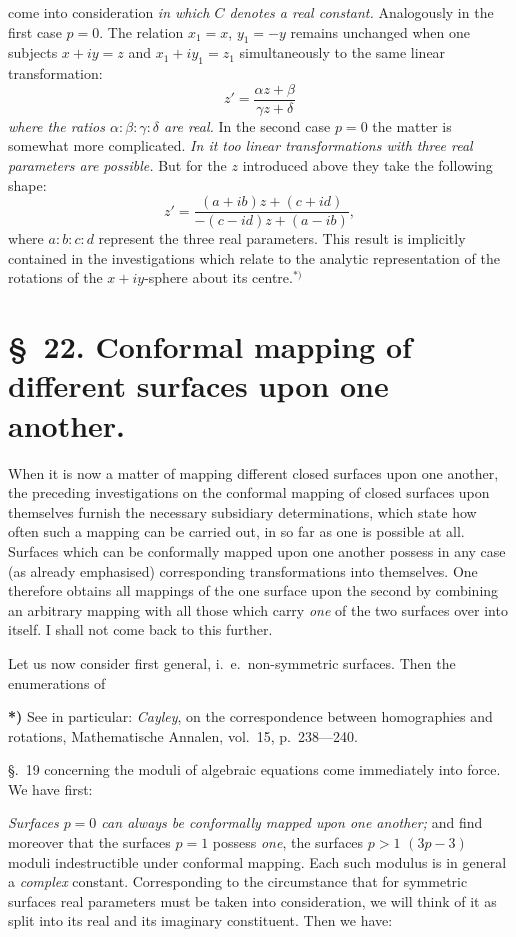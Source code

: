 \documentclass{article}
\begin{document}
come into consideration \emph{in which $C$ denotes a real constant.} Analogously in the first case $p = 0$. The relation $x_{1} = x$, $y_{1} = - y$ remains unchanged when one subjects $x + iy = z$ and $x_{1} + iy_{1} = z_{1}$ simultaneously to the same linear transformation:
\[ z' = \frac{\alpha z + \beta}{\gamma z + \delta} \]
\emph{where the ratios $\alpha : \beta : \gamma : \delta$ are real.} In the second case $p = 0$ the matter is somewhat more complicated. \emph{In it too linear transformations with three real parameters are possible.} But for the $z$ introduced above they take the following shape:
\[ z' = \frac{(a + ib)z + (c + id)}{- (c - id)z + (a - ib)}, \]
where $a : b : c : d$ represent the three real parameters. This result is implicitly contained in the investigations which relate to the analytic representation of the rotations of the $x + iy$-sphere about its centre.${}^{*)}$

\section*{§~22. Conformal mapping of different surfaces upon one another.}

When it is now a matter of mapping different closed surfaces upon one another, the preceding investigations on the conformal mapping of closed surfaces upon themselves furnish the necessary subsidiary determinations, which state how often such a mapping can be carried out, in so far as one is possible at all. Surfaces which can be conformally mapped upon one another possess in any case (as already emphasised) corresponding transformations into themselves. One therefore obtains all mappings of the one surface upon the second by combining an arbitrary mapping with all those which carry \emph{one} of the two surfaces over into itself. I shall not come back to this further.

Let us now consider first general, i.\ e.\ non-symmetric surfaces. Then the enumerations of

\textbf{*)} See in particular: \emph{Cayley}, on the correspondence between homographies and rotations, Mathematische Annalen, vol.~15, p.~238---240.

§.~19 concerning the moduli of algebraic equations come immediately into force. We have first:

\emph{Surfaces $p = 0$ can always be conformally mapped upon one another;}
and find moreover that the surfaces $p = 1$ possess \emph{one}, the surfaces $p > 1$ $(3p - 3)$ moduli indestructible under conformal mapping. Each such modulus is in general a \emph{complex} constant. Corresponding to the circumstance that for symmetric surfaces real parameters must be taken into consideration, we will think of it as split into its real and its imaginary constituent. Then we have:
\end{document}

